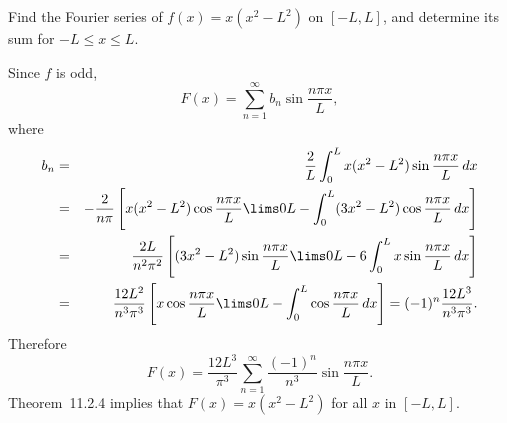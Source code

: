 \setcounter{example}{5}
\begin{example}
  \label{example:11.2.6} \rm Find the Fourier series of $f(x)=x(x^{2}-L^{2})$ on $[-L,L]$, and
  determine its sum for $-L\le x\le L$.
\end{example}
\begin{examplesolution}
\solution Since $f$ is odd,
\[
  F(x)=\sum_{n=1}^{\infty}b_{n}\sin\frac{n\pi x}{L},
\]
where
\begin{eqnarray*}
  b_{n} & = & \frac{2}{L}\int_{0}^{L}x(x^{2}-L^{2})\sin\frac{n\pi x}{L}\,dx                                                            \\
        & = & -\frac{2}{n\pi}\left[x(x^{2}-L^{2})\cos\frac{n\pi x}{L}\lims0L-\int_{0}^{L}(3x^{2}-L^{2})\cos\frac{n\pi x}{L}\,dx\right] \\
        & = & \frac{2L}{n^{2}\pi^{2}}\left[(3x^{2}-L^{2})\sin\frac{n\pi x}{L}\lims0L-6\int_{0}^{L}x\sin\frac{n\pi x}{L}\,dx\right]     \\
        & = & \frac{12L^{2}}{n^{3}\pi^{3}}\left[x\cos\frac{n\pi x}{L}\lims0L-\int_{0}^{L}\cos\frac{n\pi x}{L}\,dx\right]=(-1)^{n}\frac{12L^{3}}{n^{3}\pi^{3}}.
\end{eqnarray*}
Therefore
\[
  F(x)=\frac{12L^{3}}{\pi^{3}}\sum_{n=1}^{\infty}\frac{(-1)^{n}}{n^{3}}\sin\frac{n\pi x}{L}.
\]
Theorem~11.2.4 implies that $F(x)=x(x^{2}-L^{2})$ for all $x$ in $[-L,L]$.
\end{examplesolution}


